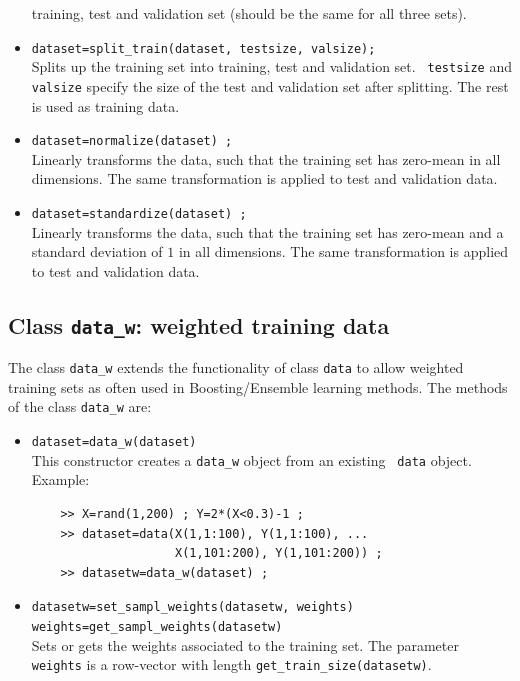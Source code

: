 \documentclass{article}
\begin{document}
\begin{itemize}
  training, test and validation set (should be the same for all three sets).
\item {\tt dataset=split\_train(dataset, testsize, valsize);}\\
  Splits up the training set into training, test and validation set. {\tt
    testsize} and {\tt valsize} specify the size of the test and validation
  set after splitting. The rest is used as training data.
\item {\tt dataset=normalize(dataset) ;}\\
  Linearly transforms the data, such that the training set has zero-mean in
  all dimensions. The same transformation is applied to test and validation
  data.
\item {\tt dataset=standardize(dataset) ;}\\
  Linearly transforms the data, such that the training set has zero-mean and a
  standard deviation of $1$ in all dimensions. The same transformation is
  applied to test and validation data.
\end{itemize}

\subsection{Class {\tt data\_w}: weighted training data}
The class {\tt data\_w} extends the functionality of class {\tt data} to
allow weighted training sets as often used in Boosting/Ensemble learning
methods.  The methods of the class {\tt data\_w} are:
\begin{itemize}
\item {\tt dataset=data\_w(dataset)}\\
  This constructor creates a {\tt data\_w} object from an existing {\tt
    data} object.  \\
  Example:
  \begin{verbatim}
    >> X=rand(1,200) ; Y=2*(X<0.3)-1 ;
    >> dataset=data(X(1,1:100), Y(1,1:100), ...
                    X(1,101:200), Y(1,101:200)) ;
    >> datasetw=data_w(dataset) ;
  \end{verbatim}
\vspace*{-5mm}
\item {\tt datasetw=set\_sampl\_weights(datasetw, weights)\\
    weights=get\_sampl\_weights(datasetw)}\\
  Sets or gets the weights associated to the training set. The parameter {\tt
    weights} is a row-vector with length {\tt get\_train\_size(datasetw)}.
\end{itemize}
\end{document}
